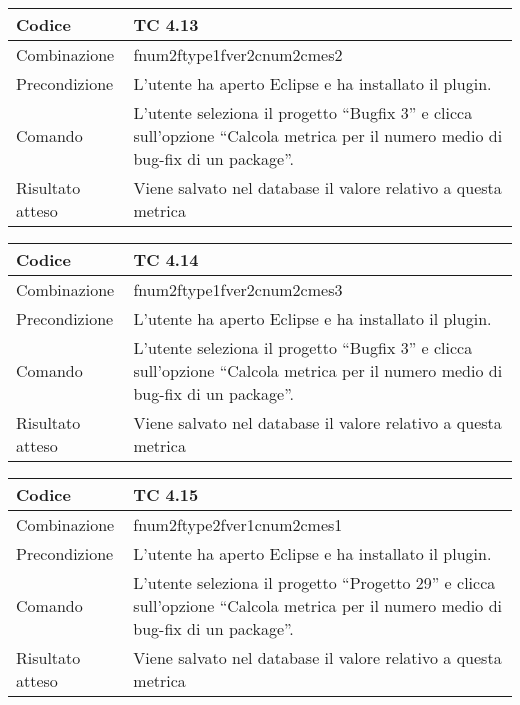 \begin{table}[ht]
\begin{tabular}{|p{3cm}|p{9cm}|}
\hline
\cellcolor{lightgray}Codice				& TC 4.13								\\
\hline
\cellcolor{lightgray}Combinazione		& fnum2ftype1fver2cnum2cmes2									\\
\hline
\cellcolor{lightgray}Precondizione		& L'utente ha aperto Eclipse e ha installato il plugin.					\\
\hline
\cellcolor{lightgray}Comando			& L'utente seleziona il progetto ``Bugfix 3''  e clicca sull'opzione ``Calcola metrica per il numero medio di bug-fix di un package''.	\\
\hline
\cellcolor{lightgray}Risultato atteso	& Viene salvato nel database il valore relativo a questa metrica	\\
\hline
\end{tabular}
\end{table}

\begin{table}[ht]
\begin{tabular}{|p{3cm}|p{9cm}|}
\hline
\cellcolor{lightgray}Codice				& TC 4.14								\\
\hline
\cellcolor{lightgray}Combinazione		& fnum2ftype1fver2cnum2cmes3								\\
\hline
\cellcolor{lightgray}Precondizione		& L'utente ha aperto Eclipse e ha installato il plugin.			\\
\hline
\cellcolor{lightgray}Comando			& L'utente seleziona il progetto ``Bugfix 3''  e clicca sull'opzione ``Calcola metrica per il numero medio di bug-fix di un package''.	\\
\hline
\cellcolor{lightgray}Risultato atteso	& Viene salvato nel database il valore relativo a questa metrica	\\
\hline
\end{tabular}
\end{table}

\begin{table}[ht]
\begin{tabular}{|p{3cm}|p{9cm}|}
\hline
\cellcolor{lightgray}Codice				& TC 4.15								\\
\hline
\cellcolor{lightgray}Combinazione		& fnum2ftype2fver1cnum2cmes1 									\\
\hline
\cellcolor{lightgray}Precondizione		& L'utente ha aperto Eclipse e ha installato il plugin.			\\
\hline
\cellcolor{lightgray}Comando			& L'utente seleziona il progetto ``Progetto 29''  e clicca sull'opzione ``Calcola metrica per il numero medio di bug-fix di un package''.	\\
\hline
\cellcolor{lightgray}Risultato atteso	& Viene salvato nel database il valore relativo a questa metrica	\\
\hline
\end{tabular}
\end{table}

